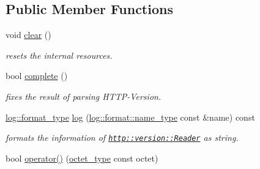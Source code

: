 \subsection*{Public Member Functions}
\begin{DoxyCompactItemize}
\item 
\hypertarget{classhryky_1_1http_1_1version_1_1_reader_aa244feccbc3eb62fb0cc69a7e9ab3037}{void \hyperlink{classhryky_1_1http_1_1version_1_1_reader_aa244feccbc3eb62fb0cc69a7e9ab3037}{clear} ()}\label{classhryky_1_1http_1_1version_1_1_reader_aa244feccbc3eb62fb0cc69a7e9ab3037}

\begin{DoxyCompactList}\small\item\em resets the internal resources. \end{DoxyCompactList}\item 
\hypertarget{classhryky_1_1http_1_1version_1_1_reader_a1df987f35150a3416a3ba4be01342527}{bool \hyperlink{classhryky_1_1http_1_1version_1_1_reader_a1df987f35150a3416a3ba4be01342527}{complete} ()}\label{classhryky_1_1http_1_1version_1_1_reader_a1df987f35150a3416a3ba4be01342527}

\begin{DoxyCompactList}\small\item\em fixes the result of parsing H\-T\-T\-P-\/\-Version. \end{DoxyCompactList}\item 
\hypertarget{classhryky_1_1http_1_1version_1_1_reader_aac1f2ba27664321945d7574052cebf90}{\hyperlink{namespacehryky_1_1log_ad50448c3f934f1eacd5c1bcffe8111e1}{log\-::format\-\_\-type} \hyperlink{classhryky_1_1http_1_1version_1_1_reader_aac1f2ba27664321945d7574052cebf90}{log} (\hyperlink{namespacehryky_1_1log_1_1format_ab7408d1e2ed2d648dbf9bba69eb74288}{log\-::format\-::name\-\_\-type} const \&name) const }\label{classhryky_1_1http_1_1version_1_1_reader_aac1f2ba27664321945d7574052cebf90}

\begin{DoxyCompactList}\small\item\em formats the information of \href{http::version::Reader}{\tt http\-::version\-::\-Reader} as string. \end{DoxyCompactList}\item 
\hypertarget{classhryky_1_1http_1_1version_1_1_reader_aa8e28f3fe6ad12150b63930be8c6b73b}{bool \hyperlink{classhryky_1_1http_1_1version_1_1_reader_aa8e28f3fe6ad12150b63930be8c6b73b}{operator()} (\hyperlink{namespacehryky_a488cba8b666be33ccca70e819684e3c8}{octet\-\_\-type} const octet)}\label{classhryky_1_1http_1_1version_1_1_reader_aa8e28f3fe6ad12150b63930be8c6b73b}


\end{DoxyCompactItemize}
